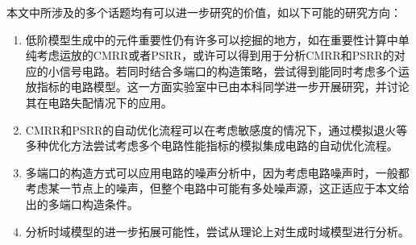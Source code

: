 本文中所涉及的多个话题均有可以进一步研究的价值，如以下可能的研究方向：

\begin{enumerate}[label=\emph{\alph*})]
	\item 低阶模型生成中的元件重要性仍有许多可以挖掘的地方，如在重要性计算中单纯考虑运放的CMRR或者PSRR，或许可以得到用于分析CMRR和PSRR的对应的小信号电路。若同时结合多端口的构造策略，尝试得到能同时考虑多个运放指标的电路模型。这一方面实验室中已由本科同学进一步开展研究，并讨论其在电路失配情况下的应用。
	\item CMRR和PSRR的自动优化流程可以在考虑敏感度的情况下，通过模拟退火等多种优化方法尝试考虑多个电路性能指标的模拟集成电路的自动优化流程。
	\item 多端口的构造方式可以应用电路的噪声分析中，因为考虑电路噪声时，一般都考虑某一节点上的噪声，但整个电路中可能有多处噪声源，这正适应于本文给出的多端口构造条件。
	\item 分析时域模型的进一步拓展可能性，尝试从理论上对生成时域模型进行分析。
\end{enumerate}